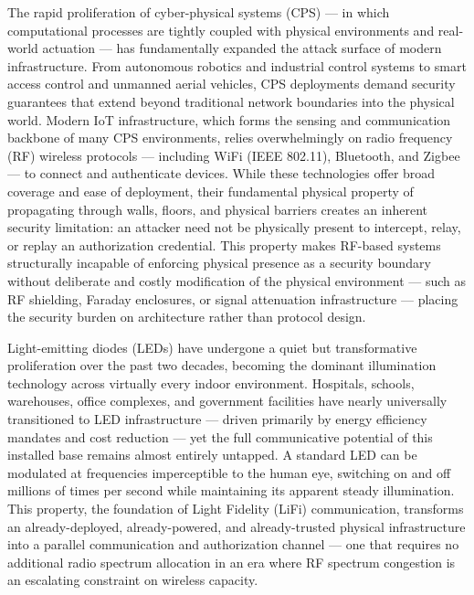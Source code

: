 \documentclass[conference]{IEEEtran}
\begin{document}
The rapid proliferation of cyber-physical systems (CPS) — in which computational processes are tightly coupled with physical environments and real-world actuation — has fundamentally expanded the attack surface of modern infrastructure. From autonomous robotics and industrial control systems to smart access control and unmanned aerial vehicles, CPS deployments demand security guarantees that extend beyond traditional network boundaries into the physical world. Modern IoT infrastructure, which forms the sensing and communication backbone of many CPS environments, relies overwhelmingly on radio frequency (RF) wireless protocols — including WiFi (IEEE 802.11), Bluetooth, and Zigbee — to connect and authenticate devices. While these technologies offer broad coverage and ease of deployment, their fundamental physical property of propagating through walls, floors, and physical barriers creates an inherent security limitation: an attacker need not be physically present to intercept, relay, or replay an authorization credential. This property makes RF-based systems structurally incapable of enforcing physical presence as a security boundary without deliberate and costly modification of the physical environment — such as RF shielding, Faraday enclosures, or signal attenuation infrastructure — placing the security burden on architecture rather than protocol design.

Light-emitting diodes (LEDs) have undergone a quiet but transformative proliferation over the past two decades, becoming the dominant illumination technology across virtually every indoor environment. Hospitals, schools, warehouses, office complexes, and government facilities have nearly universally transitioned to LED infrastructure — driven primarily by energy efficiency mandates and cost reduction — yet the full communicative potential of this installed base remains almost entirely untapped. A standard LED can be modulated at frequencies imperceptible to the human eye, switching on and off millions of times per second while maintaining its apparent steady illumination. This property, the foundation of Light Fidelity (LiFi) communication, transforms an already-deployed, already-powered, and already-trusted physical infrastructure into a parallel communication and authorization channel — one that requires no additional radio spectrum allocation in an era where RF spectrum congestion is an escalating constraint on wireless capacity.
\end{document}
